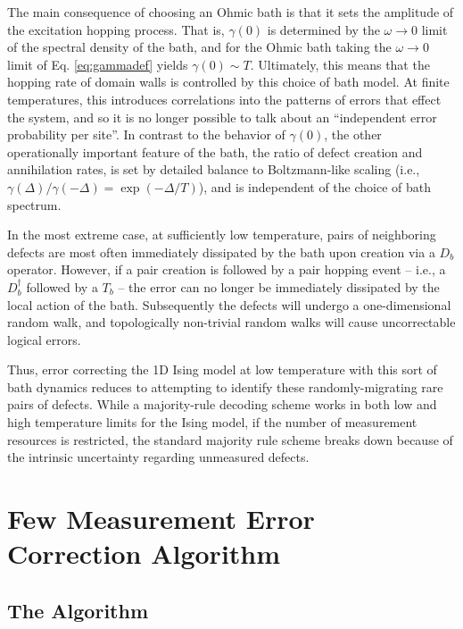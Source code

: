 \documentclass[twocolumn,superscriptaddress,aps,prb,floatfix]{revtex4-1}
\begin{document}
 The main consequence of choosing an Ohmic bath is that it sets the amplitude of the excitation hopping process.  That is, $\gamma(0)$ is determined by the $\omega \rightarrow 0$ limit of the spectral density of the bath, and for the Ohmic bath taking the $\omega\rightarrow0$ limit of  Eq. \ref{eq:gammadef} yields $\gamma(0) \sim T$. 
Ultimately, this means that the hopping rate of domain walls is controlled by this choice of bath model. At finite temperatures, this introduces correlations into the patterns of errors that effect the system, and so it is no longer possible to talk about an ``independent error probability per site''. 
In contrast to the behavior of $\gamma(0)$, 
the other operationally important feature of the bath, the ratio of defect creation and annihilation rates, is set by detailed balance to Boltzmann-like scaling (i.e., $\gamma(\Delta)/\gamma(-\Delta) = \exp(-\Delta/T)$), and is independent of the choice of bath spectrum.
 
 In the most extreme case, at sufficiently low temperature, pairs of neighboring defects are most often immediately dissipated by the bath upon creation via a $D_b$ operator.  However, if a pair creation is followed by a pair hopping event -- i.e., a $D^\dagger_{b}$ followed by a $T_{b}$ -- the error can no longer be immediately dissipated by the local action of the bath.  Subsequently the defects will undergo a one-dimensional random walk, and topologically non-trivial random walks will cause uncorrectable logical errors.
 
 Thus, error correcting the 1D Ising model at low temperature with this sort of bath dynamics reduces to attempting to identify these randomly-migrating rare pairs of defects.  While a majority-rule decoding scheme works in both low and high temperature limits for the Ising model, if the number of measurement resources is restricted, the standard majority rule scheme breaks down because of the intrinsic uncertainty regarding unmeasured defects.
 
 
\section{Few Measurement Error Correction Algorithm}
\label{sec:ecc_alg}

\subsection{The Algorithm}
\end{document}
